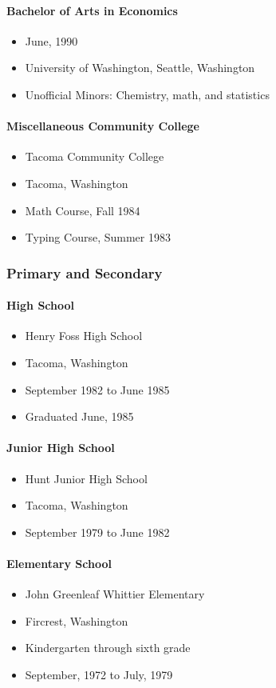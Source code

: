 \documentclass[12pt]{article}
\begin{document}
\paragraph{Bachelor of Arts in Economics}

\begin{itemize}

\item
  June, 1990
\item
  University of Washington, Seattle, Washington
\item
  Unofficial Minors: Chemistry, math, and statistics
\end{itemize}

\paragraph {Miscellaneous Community College}
\begin{itemize}
\item Tacoma Community College
\item Tacoma, Washington
\item Math Course, Fall 1984
\item Typing Course, Summer 1983
\end{itemize}

\subsubsection{Primary and Secondary}

\paragraph {High School}
\begin{itemize}
\item Henry Foss High School
\item Tacoma, Washington
\item September 1982 to June 1985
\item Graduated June, 1985
\end{itemize}

\paragraph {Junior High School}  
\begin{itemize}
\item Hunt Junior High School
\item Tacoma, Washington
\item September 1979 to June 1982
\end{itemize}

\paragraph {Elementary School}

\begin{itemize}
\item John Greenleaf Whittier Elementary
\item Fircrest, Washington
\item Kindergarten through sixth grade
\item September, 1972 to July, 1979
\end{itemize}
\end{document}
